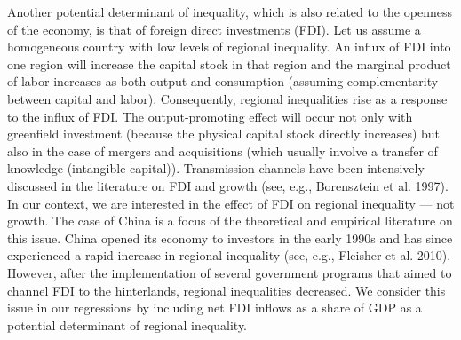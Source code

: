 \documentclass[10pt]{article}
\begin{document}
Another potential determinant of inequality, which is also related to the openness of the economy, is that of foreign direct investments (FDI). Let us assume a homogeneous country with low levels of regional inequality. An influx of FDI into one region will increase the capital stock in that region and the marginal product of labor increases as both output and consumption (assuming complementarity between capital and labor). Consequently, regional inequalities rise as a response to the influx of FDI. The output-promoting effect will occur not only with greenfield investment (because the physical capital stock directly increases) but also in the case of mergers and acquisitions (which usually involve a transfer of knowledge (intangible capital)). Transmission channels have been intensively discussed in the literature on FDI and growth (see, e.g., Borensztein et al. 1997). In our context, we are interested in the effect of FDI on regional inequality — not growth. The case of China is a focus of the theoretical and empirical literature on this issue. China opened its economy to investors in the early 1990s and has since experienced a rapid increase in regional inequality (see, e.g., Fleisher et al. 2010). However, after the implementation of several government programs that aimed to channel FDI to the hinterlands, regional inequalities decreased. We consider this issue in our regressions by including net FDI inflows as a share of GDP as a potential determinant of regional inequality.
\end{document}
